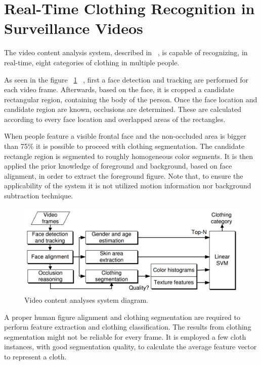 \documentclass[titlepage,12pt,a4paper,times]{book}
\begin{document}
\section{Real-Time Clothing Recognition in Surveillance Videos}
\label{chap2:sec:art1}

The video content analysis system, described in ~\citep{1}, is capable of
recognizing, in real-time, eight categories of clothing in multiple people.

As seen in the figure ~\ref{fig:vcasd} ~\citep{1}, first a face detection and
tracking are performed for each video frame. Afterwards, based on the face, it
is cropped a candidate rectangular region, containing the body of the person.
Once the face location and candidate region are known, occlusions are
determined. These are calculated according to every face location and
overlapped areas of the rectangles.

When people feature a visible frontal face and the non-occluded area is bigger
than 75\% it is possible to proceed with clothing segmentation. The candidate
rectangle region is segmented to roughly homogeneous color segments. It is then
applied the prior knowledge of foreground and background, based on face
alignment, in order to extract the foreground figure. Note that, to ensure the
applicability of the system it is not utilized motion information nor
background subtraction technique.

\begin{figure}[!h]
\centering
\includegraphics[scale=0.5]{images/Clothing_Diagram_1.png}
\caption{Video content analyses system diagram.}
\label{fig:vcasd}
\end{figure}
\FloatBarrier

A proper human figure alignment and clothing segmentation are required to
perform feature extraction and clothing classification. The results from
clothing segmentation might not be reliable for every frame. It is employed a
few cloth instances, with good segmentation quality, to calculate the average
feature vector to represent a cloth.
\end{document}
